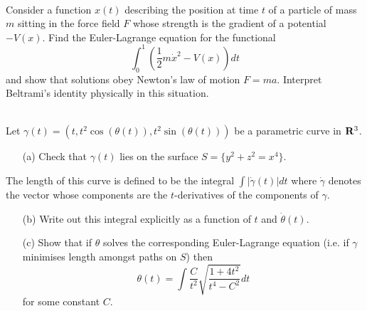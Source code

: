 \documentclass[12pt]{article}
\begin{document}
\newpage
\fi

\begin{question}\ \\
Consider a function $x(t)$ describing the position at time $t$ of a particle of mass $m$ sitting in the force field $F$ whose strength is the gradient of a potential $-V(x)$. Find the Euler-Lagrange equation for the functional
\[\int_0^1\left(\dfrac{1}{2}m\dot{x}^2-V(x)\right)dt\]
and show that solutions obey Newton's law of motion $F=ma$. Interpret Beltrami's identity physically in this situation.
\end{question}

\bigskip

\begin{question}\ \\
Let $\gamma(t)=(t,t^2\cos(\theta(t)),t^2\sin(\theta(t)))$ be a parametric curve in $\mathbf{R}^3$.
\begin{enumerate}
\item[(a)] Check that $\gamma(t)$ lies on the surface $S=\{y^2+z^2=x^4\}$.
\end{enumerate}
The length of this curve is defined to be the integral $\int|\dot{\gamma}(t)|dt$ where $\dot{\gamma}$ denotes the vector whose components are the $t$-derivatives of the components of $\gamma$.
\begin{enumerate}
\item[(b)] Write out this integral explicitly as a function of $t$ and $\dot{\theta}(t)$.
\item[(c)] Show that if $\theta$ solves the corresponding Euler-Lagrange equation (i.e. if $\gamma$ minimises length amongst paths on $S$) then
\[\theta(t)=\int\frac{C}{t^2}\sqrt{\frac{1+4t^2}{t^4-C^2}}dt\]
for some constant $C$.
\end{enumerate}
\end{question}
\end{document}
